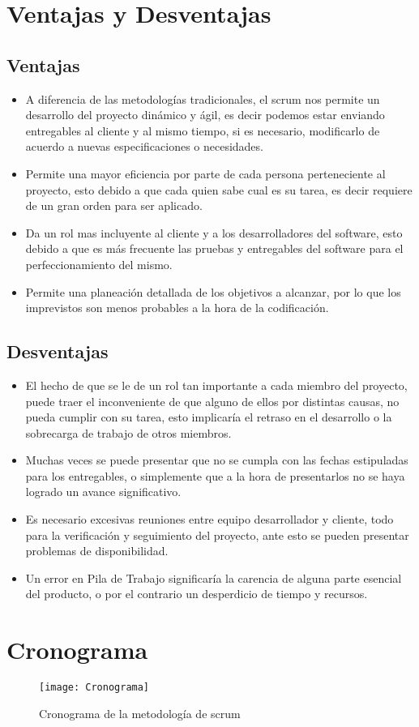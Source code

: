 \section{Ventajas y Desventajas}

\subsection{Ventajas}

\begin{itemize}
\item A diferencia de las metodologías tradicionales, el scrum nos permite un desarrollo del proyecto dinámico y ágil, es decir podemos estar enviando entregables al cliente y al mismo tiempo, si es necesario, modificarlo de acuerdo a nuevas especificaciones o necesidades.

\item Permite una mayor eficiencia por parte de cada persona perteneciente al proyecto, esto debido a que cada quien sabe cual es su tarea, es decir requiere de un gran orden para ser aplicado.

\item Da un rol mas incluyente al cliente y a los desarrolladores del software, esto debido a que es más frecuente las pruebas y entregables del software para el perfeccionamiento del mismo.

\item Permite una planeación detallada de los objetivos a alcanzar, por lo que los imprevistos son menos probables a la hora de la codificación. 
\end{itemize} 
\subsection{Desventajas}

\begin{itemize}
\item El hecho de que se le de un rol tan importante a cada miembro del proyecto, puede traer el inconveniente de que alguno de ellos por distintas causas, no pueda cumplir con su tarea, esto implicaría el retraso en el desarrollo o la sobrecarga de trabajo de otros miembros.

\item Muchas veces se puede presentar que no se cumpla con las fechas estipuladas para los entregables, o simplemente que a la hora de presentarlos no se haya logrado un avance significativo.

\item Es necesario excesivas reuniones entre equipo desarrollador y cliente, todo para la verificación y seguimiento del proyecto, ante esto se pueden presentar problemas de disponibilidad.

\item Un error en Pila de Trabajo significaría la carencia de alguna parte esencial del producto, o por el contrario un desperdicio de tiempo y recursos.
\end{itemize} 

\section{Cronograma}
\begin{figure}[th!]
	\centering
	\texttt{[image: Cronograma]}
    \caption{Cronograma de la metodología de scrum}
	\label{fig:Cronograma}
\end{figure}